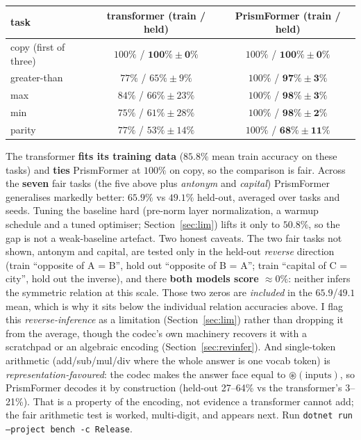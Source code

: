 \documentclass[11pt]{article}
\newcommand{\bind}{\mathbin{\circledast}}         %
\newcommand{\code}[1]{\texttt{#1}}
\begin{document}
\begin{center}
\begin{tabular}{@{}lcc@{}}
\toprule
task & transformer (train / held) & PrismFormer (train / held) \\
\midrule
copy (first of three) & $100\%$ / $\mathbf{100\% \pm 0\%}$ & $100\%$ / $\mathbf{100\% \pm 0\%}$ \\
greater-than & $77\%$ / $65\% \pm 9\%$  & $100\%$ / $\mathbf{97\% \pm 3\%}$ \\
max          & $84\%$ / $66\% \pm 23\%$ & $100\%$ / $\mathbf{98\% \pm 3\%}$ \\
min          & $75\%$ / $61\% \pm 28\%$ & $100\%$ / $\mathbf{98\% \pm 2\%}$ \\
parity       & $77\%$ / $53\% \pm 14\%$ & $100\%$ / $\mathbf{68\% \pm 11\%}$ \\
\bottomrule
\end{tabular}
\end{center}

The transformer \textbf{fits its training data} ($85.8\%$ mean train accuracy on these tasks) and
\textbf{ties} PrismFormer at $100\%$ on copy, so the comparison is fair. Across the \textbf{seven} fair tasks (the five above plus \emph{antonym} and \emph{capital})
PrismFormer generalises markedly better: $\mathbf{65.9\%}$ vs $\mathbf{49.1\%}$ held-out, averaged over
tasks and seeds. Tuning the baseline hard (pre-norm layer normalization, a warmup schedule and a tuned
optimiser; Section~\ref{sec:lim}) lifts it only to $50.8\%$, so the gap is not a weak-baseline artefact.
Two honest caveats. The two fair tasks not shown, antonym and capital, are tested only
in the held-out \emph{reverse} direction (train ``opposite of A = B'', hold out ``opposite of B = A'';
train ``capital of C = city'', hold out the inverse), and there \textbf{both models score
$\approx 0\%$}: neither infers the symmetric relation at this scale. Those two zeros are \emph{included}
in the $65.9$/$49.1$ mean, which is why it sits below the individual relation accuracies above. I flag
this \emph{reverse-inference} as a limitation (Section~\ref{sec:lim}) rather than dropping it from the
average, though the codec's own machinery recovers it with a scratchpad or an algebraic encoding
(Section~\ref{sec:revinfer}). And single-token arithmetic (add/sub/mul/div where the whole answer is one
vocab token) is \emph{representation-favoured}: the codec makes the answer face equal to
$\bind(\text{inputs})$, so PrismFormer decodes it by construction (held-out 27--64\% vs the
transformer's 3--21\%). That is a property of the encoding, not evidence a transformer cannot add; the
fair arithmetic test is worked, multi-digit, and appears next. Run \code{dotnet run --project bench -c
Release}.
\end{document}
